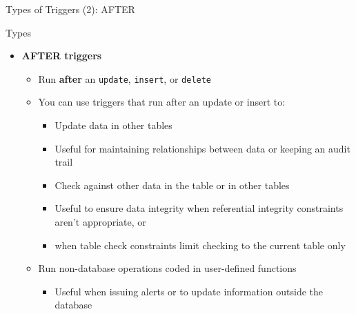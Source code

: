 \documentclass[aspectratio=169, xcolor=dvipsnames]{beamer}
\begin{document}
\begin{frame}{Types of Triggers (2): AFTER}
    \begin{block}{Types}
        \begin{itemize}[<+->]
            \item \textbf{AFTER triggers}
            \begin{itemize}
                \item[$\triangleright$] Run \textbf{after} an \texttt{update}, \texttt{insert}, or \texttt{delete}
                \item[$\triangleright$] You can use triggers that run after an update or insert to:
                \begin{itemize}
                    \item Update data in other tables
                    \item Useful for maintaining relationships between data or keeping an audit trail
                    \item Check against other data in the table or in other tables
                    \item Useful to ensure data integrity when referential integrity constraints aren't appropriate, or
                    \item when table check constraints limit checking to the current table only
                \end{itemize}
                \item[$\triangleright$] Run non-database operations coded in user-defined functions
                \begin{itemize}
                    \item Useful when issuing alerts or to update information outside the database
                \end{itemize}
            \end{itemize}
        \end{itemize}
    \end{block}
\end{frame}
\end{document}
